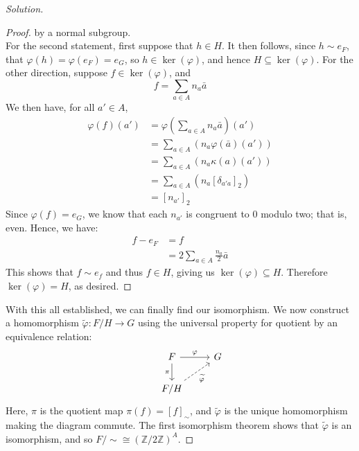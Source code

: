 \documentclass[12pt]{article}
\newenvironment{solution}
  {\renewcommand\qedsymbol{$\blacksquare$}\begin{proof}[Solution]}
{\end{proof}}
\newenvironment{sproof}{
  \renewcommand\qedsymbol{$\square$}
  \begin{proof}
  }{
  \end{proof}
}
\begin{document}
\begin{solution}
\begin{sproof}
    by a normal subgroup. \\
    For the second statement, first suppose that $h\in H$. 
    It then follows, since $h\sim e_F$, that $\varphi(h) = \varphi(e_F) = e_G$, so $h\in \ker(\varphi)$,
    and hence $H\subseteq \ker(\varphi)$.
    For the other direction, suppose $f\in\ker(\varphi)$, and 
    \begin{equation*}
      f = \sum_{a\in A} n_a \bar{a}
    \end{equation*}
    We then have, for all $a'\in A$,
    \begin{align*}
      \varphi(f)(a') &= \varphi\left( \sum_{a\in A} n_a\bar{a} \right)(a') \\
      &= \sum_{a\in A}\left( n_a\varphi(\bar{a})(a') \right) \\
      &= \sum_{a\in A}\left( n_a\kappa(a)(a') \right) \\
      &= \sum_{a\in A}\left( n_a[\delta_{a'a}]_2 \right) \\
      &= [n_{a'}]_2
    \end{align*}
    Since $\varphi(f) = e_G$, we know that each $n_{a'}$ is congruent to 0 modulo two; that is, even.
    Hence, we have:
    \begin{align*}
      f - e_F &= f \\
      &= 2\sum_{a\in A} \frac{n_a}{2} \bar{a}
    \end{align*}
    This shows that $f\sim e_f$ and thus $f \in H$, giving us $\ker(\varphi)\subseteq H$.
    Therefore $\ker(\varphi) = H$, as desired.
  \end{sproof}
  With this all established, we can finally find our isomorphism.
  We now construct a homomorphism 
  $\widetilde{\varphi} : F/H\to G$ using the universal property for quotient by an equivalence relation:
  \[\begin{tikzcd}
      & F \ar{d}[swap]{\pi} \ar{r}{\varphi} & G \\
    & F/H \ar[dashed]{ur}[swap]{\widetilde{\varphi}} &
  \end{tikzcd}\]
  Here, $\pi$ is the quotient map $\pi(f) = [f]_{\sim}$, and $\widetilde{\varphi}$ is the unique homomorphism
  making the diagram commute.
  The first isomorphism theorem shows that $\widetilde{\varphi}$ is an isomorphism,
  and so $F/{\sim} \cong (\mathbb{Z}/2\mathbb{Z})^A$.
\end{solution}
\end{document}
